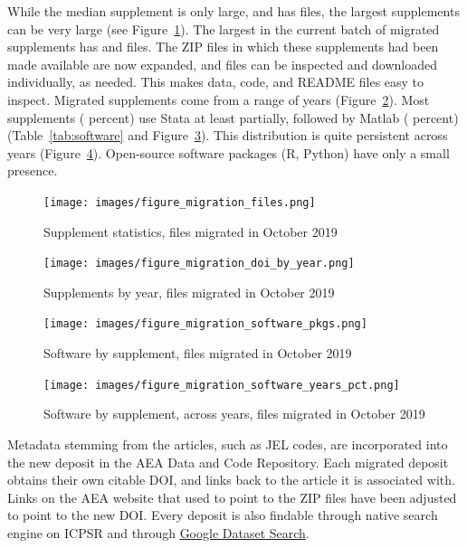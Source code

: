 \documentclass[PP]{AEA}
\newcommand{\aeadcr}{AEA Data and Code Repository}
\begin{document}
While the median  supplement is only \nummediansizeMB{} large, and has \nummedianfilecount{} files, the largest supplements can be very large (see Figure~\ref{fig:migration_files}).  The largest in the current batch of migrated supplements has \nummaxsizeMB{} and \nummaxfilecount{} files. The ZIP files in which these supplements had been made available are now expanded, and files can be inspected and downloaded individually, as needed. This makes  data, code, and README files easy to inspect. Migrated supplements come from a range of years (Figure~\ref{fig:migration_doi_by_year}). Most supplements (\numsupplementsstatapct{} percent) use Stata at least partially, followed by Matlab (\numsupplementsmatlabpct{} percent) (Table~\ref{tab:software} and Figure~\ref{fig:migration_software_pkgs}). This distribution is quite persistent across years (Figure~\ref{fig:migration_software_years_pct}). Open-source software packages (R, Python) have only a small presence.

\begin{figure}
    \centering
    \texttt{[image: images/figure\_migration\_files.png]}
    \caption{Supplement statistics, files migrated in October 2019}
    \label{fig:migration_files}
\end{figure}

\begin{figure}
    \centering
    \texttt{[image: images/figure\_migration\_doi\_by\_year.png]}
    \caption{Supplements by year, files migrated in October 2019}
    \label{fig:migration_doi_by_year}
\end{figure}

\begin{figure}
    \centering
    \texttt{[image: images/figure\_migration\_software\_pkgs.png]}
    \caption{Software by supplement, files migrated in October 2019}
    \label{fig:migration_software_pkgs}
\end{figure}



\begin{figure}
    \centering
    \texttt{[image: images/figure\_migration\_software\_years\_pct.png]}
    \caption{Software by supplement, across years, files migrated in October 2019}
    \label{fig:migration_software_years_pct}
\end{figure}

Metadata stemming from the articles, such as JEL codes, are incorporated into the new deposit in the \aeadcr{}. Each migrated deposit  obtains their own citable \ac{DOI}, and links back to the article it is associated with. Links on the AEA website that used to point to the ZIP files have been adjusted to point to the new \ac{DOI}. Every deposit is also findable through native search engine on ICPSR and through \href{https://toolbox.google.com/datasetsearch}{Google Dataset Search}. 
\end{document}
